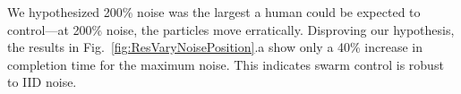 We hypothesized 200\% noise was the largest a human could be expected to control---at 200\% noise, the particles move erratically.  Disproving our hypothesis, the results in Fig.~\ref{fig:ResVaryNoisePosition}.a show only a 40\% increase in completion time for the maximum noise. This indicates swarm control is robust to IID noise.




%




%
%

